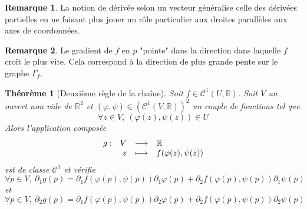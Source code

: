 \documentclass[french]{book}
\newcommand{\R}{\mathbb{R}}
\theoremstyle{plain}
\newtheorem{thm}{Théorème}[chapter]
\theoremstyle{definition}
\newtheorem{rmq}{Remarque}[chapter]
\theoremstyle{remark}
\begin{document}
\begin{rmq} La notion de dérivée selon un vecteur généralise celle des dérivées partielles en ne faisant plus jouer un rôle particulier aux droites parallèles aux axes de coordonnées. \end{rmq}
\begin{rmq} Le gradient de $f$ en $p$ "pointe" dans la direction dans laquelle $f$ croît le plus vite. Cela correspond à la direction de plus grande pente sur le graphe $\Gamma_f$. \end{rmq}

\begin{thm}[Deuxième règle de la chaîne]
	Soit $f\in\mathcal{C}^1(U,\R)$. Soit $V$ un ouvert non vide de $\R^2$ et $(\varphi,\psi)\in(\mathcal{C}^1(V,\R))^2$ un couple de fonctions tel que $$\forall z \in V, \ (\varphi(z),\psi(z))\in U$$ Alors l'application composée 
	$$
	\begin{array}[t]{lrcl}
		g: & V & \longrightarrow & \R \\
		& z & \longmapsto & f(\varphi(z),\psi(z))
	\end{array}
	$$ est de classe $\mathcal{C}^1$ et vérifie $$\forall p \in V, \ \partial_1g(p)=\partial_1f(\varphi(p),\psi(p))\partial_1\varphi(p)+\partial_2f(\varphi(p),\psi(p))\partial_1\psi(p)$$ et $$\forall p\in V, \ \partial_2g(p)=\partial_1f(\varphi(p),\psi(p))\partial_2\varphi(p)+\partial_2f(\varphi(p),\psi(p))\partial_2\psi(p)$$
\end{thm}
\end{document}
